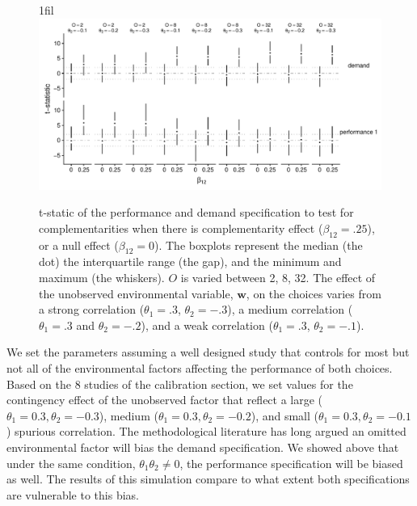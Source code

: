 \documentclass[12pt]{article}
\makeatletter
\newcommand*{\centerfloat}{%
  \parindent \z@
  \leftskip \z@ \@plus 1fil \@minus \textwidth
  \rightskip\leftskip
  \parfillskip \z@skip}
\makeatother
\begin{document}
\begin{figure}
\centerfloat
\includegraphics[width=550px]{figure-latex/spurious_plot.pdf}
\caption[Error Rate and Power with Unobserved Environmental Variables]
{\label{spurious} t-static of the performance and demand specification to test
for complementarities when there is complementarity effect ($\beta_{12} = .25$),
or a null effect ($\beta_{12} = 0$). The boxplots represent the median (the dot) the
interquartile range (the gap), and the minimum and maximum (the whiskers). $O$
is varied between 2, 8, 32. The effect of the unobserved environmental variable,
$\mathbf{w}$, on the choices varies from a strong correlation ($\theta_1 = .3$,
$\theta_2 = -.3$), a medium correlation ($\theta_1 = .3$ and $\theta_2 = -.2$),
and a weak correlation ($\theta_1 =.3$, $\theta_2 = -.1$).}
\end{figure}



We set the parameters assuming a well designed study that controls for most but not all of the environmental factors affecting the performance of both choices. Based on the 8 studies of the calibration section, we set values for the contingency effect of the unobserved factor that reflect a large ($\theta_1 = 0.3, \theta_2 = -0.3$), medium ($\theta_1 = 0.3, \theta_2 = -0.2$), and small ($\theta_1 = 0.3, \theta_2 = -0.1$) spurious correlation. The methodological literature has long argued an omitted environmental factor will bias the demand specification. We showed above that under the same condition, $\theta_1 \theta_2 \neq 0$, the performance specification will be biased as well. The results of this simulation compare to what extent both specifications are vulnerable to this bias.
\end{document}
